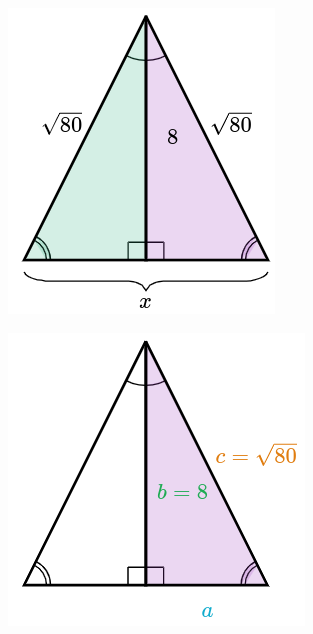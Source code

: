 \begin{solutionbox}{16cm}
    \begin{minipage}{0.2\textwidth}
        \begin{figure}[H]
            \centering
            \includegraphics[width=0.9\linewidth]{../images/pitagoras9a.png}
            \caption{}
            \label{fig:pitagoras9a}
        \end{figure}
        \begin{figure}[H]
            \centering
            \includegraphics[width=0.9\linewidth]{../images/pitagoras9b.png}

\end{figure}
\end{minipage}
\end{solutionbox}
